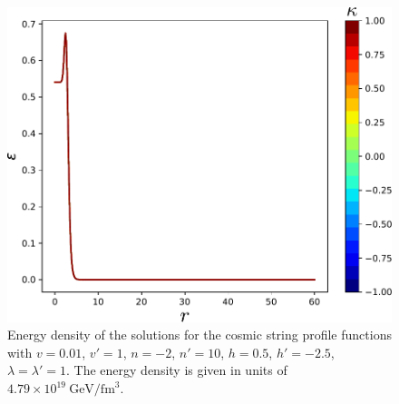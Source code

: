 \begin{figure}
	\centering
	\includegraphics[scale=1]{./figures/n-2h05np10hp-25l1lp1v001vp1eden.pdf}
	\caption{Energy density of the solutions for the cosmic string profile functions with $v = 0.01$, $v'=1$, $n=-2$, $n'=10$, $h=0.5$, $h'=-2.5$, $\lambda=\lambda'=1$. The energy density is given in units of $4.79\times 10^{19}\ \text{GeV}/\text{fm}^3$.}
	\label{fig:edencoaxial}
\end{figure}

%
%

